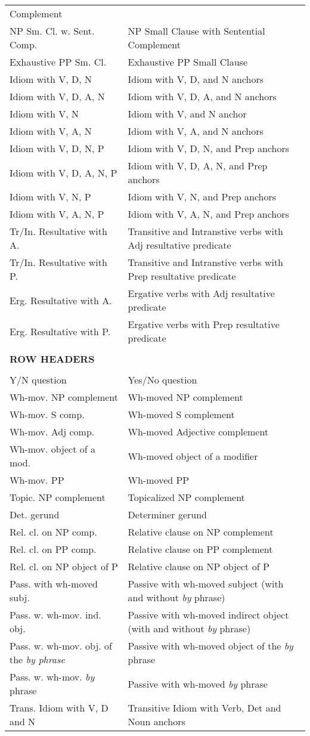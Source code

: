 \begin{tabular}{ll}
Complement\\
NP Sm. Cl. w. Sent. Comp.&NP Small Clause with Sentential Complement\\
Exhaustive PP Sm. Cl.&Exhaustive PP Small Clause\\
Idiom with V, D, N & Idiom with V, D, and N anchors \\
Idiom with V, D, A, N & Idiom with V, D, A, and N anchors \\
Idiom with V, N & Idiom with V, and N anchor \\
Idiom with V, A, N & Idiom with V, A, and N anchors \\
Idiom with V, D, N, P & Idiom with V, D, N, and Prep anchors \\
Idiom with V, D, A, N, P & Idiom with V, D, A, N, and Prep anchors \\
Idiom with V, N, P & Idiom with V, N, and Prep anchors \\
Idiom with V, A, N, P & Idiom with V, A, N, and Prep anchors \\
Tr/In. Resultative with A. & Transitive and Intranstive verbs with Adj
resultative predicate\\
Tr/In. Resultative with P. & Transitive and Intranstive verbs with Prep
resultative predicate\\
Erg. Resultative with A. & Ergative verbs with Adj
resultative predicate\\
Erg. Resultative with P. & Ergative verbs with Prep
resultative predicate\\
& \\
{\bf ROW HEADERS} & \\
& \\
Y/N question&Yes/No question \\
Wh-mov. NP complement&Wh-moved NP complement \\
Wh-mov. S comp.&Wh-moved S complement \\
Wh-mov. Adj comp.&Wh-moved Adjective complement \\
Wh-mov. object of a mod.&Wh-moved object of a modifier \\
Wh-mov. PP&Wh-moved PP \\
Topic. NP complement&Topicalized NP complement \\
Det. gerund&Determiner gerund \\
Rel. cl. on NP comp.&Relative clause on NP complement \\
Rel. cl. on PP comp.& Relative clause on PP complement\\
Rel. cl. on NP object of P& Relative clause on NP object of P\\
Pass. with wh-moved subj.&Passive with wh-moved subject (with and without {\it by} phrase) \\
Pass. w. wh-mov. ind. obj.&Passive with wh-moved indirect object (with and without {\it by} phrase) \\
Pass. w. wh-mov. obj. of the {\it {\it by} phrase}&Passive with wh-moved object of the {\it by} phrase \\
Pass. w. wh-mov. {\it by} phrase&Passive with wh-moved {\it by} phrase \\
Trans. Idiom with V, D and N & Transitive Idiom with Verb, Det and
Noun anchors\\


\end{tabular}
